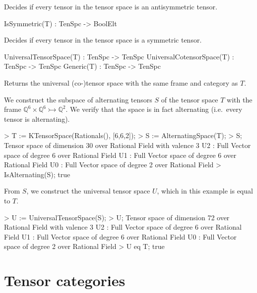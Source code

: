 Decides if every tensor in the tensor space is an antisymmetric tensor.

\begin{intrinsics}
IsSymmetric(T) : TenSpc -> BoolElt
\end{intrinsics}

Decides if every tensor in the tensor space is a symmetric tensor.

\begin{intrinsics}
UniversalTensorSpace(T) : TenSpc -> TenSpc
UniversalCotensorSpace(T) : TenSpc -> TenSpc
Generic(T) : TenSpc -> TenSpc
\end{intrinsics}

Returns the universal (co-)tensor space with the same frame and category as $T$.

\begin{example}[UniversalConst]

We construct the subspace of alternating tensors $S$ of the tensor space $T$ with the frame $\mathbb{Q}^6\times\mathbb{Q}^6\rightarrowtail \mathbb{Q}^2$. 
We verify that the space is in fact alternating (i.e.\ every tensor is alternating).
\begin{code}
> T := KTensorSpace(Rationals(), [6,6,2]);
> S := AlternatingSpace(T);
> S;
Tensor space of dimension 30 over Rational Field with valence 3
U2 : Full Vector space of degree 6 over Rational Field
U1 : Full Vector space of degree 6 over Rational Field
U0 : Full Vector space of degree 2 over Rational Field
> IsAlternating(S);
true
\end{code}

From $S$, we construct the universal tensor space $U$, which in this example is equal to $T$. 
\begin{code}
> U := UniversalTensorSpace(S);
> U;
Tensor space of dimension 72 over Rational Field with valence 3
U2 : Full Vector space of degree 6 over Rational Field
U1 : Full Vector space of degree 6 over Rational Field
U0 : Full Vector space of degree 2 over Rational Field
> U eq T;
true
\end{code}
\end{example}





\chapter{Tensor categories}\label{ch:tensor-categories}

